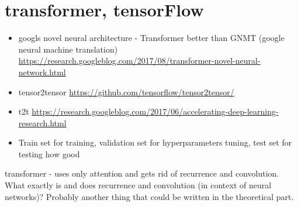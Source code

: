 \section{transformer, tensorFlow}
\begin{itemize}
    \item googls novel neural architecture - Transformer better than GNMT (google neural machine translation) \url{https://research.googleblog.com/2017/08/transformer-novel-neural-network.html}
    \item tensor2tensor \url{https://github.com/tensorflow/tensor2tensor/}
    \item t2t \url{https://research.googleblog.com/2017/06/accelerating-deep-learning-research.html}
    \item Train set for training, validation set for hyperparameters tuning, test set for testing how good
\end{itemize}

transformer - uses only attention and gets rid of recurrence and convolution. What exactly is and does recurrence and convolution (in context of neural networks)? Probably another thing that could be written in the theoretical part.



